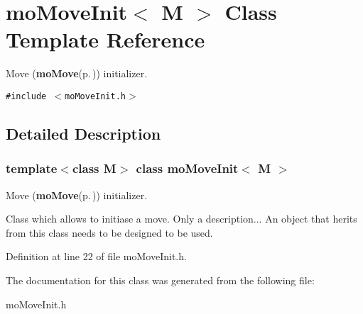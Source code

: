\section{mo\-Move\-Init$<$ M $>$ Class Template Reference}
\label{classmo_move_init}
Move ({\bf mo\-Move}{\rm (p.\,\pageref{classmo_move})}) initializer.  


{\tt \#include $<$mo\-Move\-Init.h$>$}



\subsection{Detailed Description}
\subsubsection*{template$<$class M$>$ class mo\-Move\-Init$<$ M $>$}

Move ({\bf mo\-Move}{\rm (p.\,\pageref{classmo_move})}) initializer. 

Class which allows to initiase a move. Only a description... An object that herits from this class needs to be designed to be used. 



Definition at line 22 of file mo\-Move\-Init.h.

The documentation for this class was generated from the following file:\begin{CompactItemize}
\item 
mo\-Move\-Init.h\end{CompactItemize}

